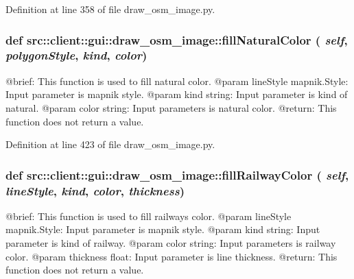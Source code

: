 Definition at line 358 of file draw\_\-osm\_\-image.py.

\hypertarget{namespacesrc_1_1client_1_1gui_1_1draw__osm__image_a273324065e46f166a37514bee78784cf}{
\subsubsection[{fillNaturalColor}]{\setlength{\rightskip}{0pt plus 5cm}def src::client::gui::draw\_\-osm\_\-image::fillNaturalColor ( {\em self}, \/   {\em polygonStyle}, \/   {\em kind}, \/   {\em color})}}
\label{namespacesrc_1_1client_1_1gui_1_1draw__osm__image_a273324065e46f166a37514bee78784cf}
\begin{DoxyVerb}
@brief: This function is used to fill natural color.
@param lineStyle mapnik.Style: Input parameter is mapnik style.
@param kind string: Input parameter is kind of natural.
@param color string: Input parameters is natural color. 
@return: This function does not return a value.
\end{DoxyVerb}
 

Definition at line 423 of file draw\_\-osm\_\-image.py.

\hypertarget{namespacesrc_1_1client_1_1gui_1_1draw__osm__image_a1e1d997267928524a9aaafed1e2a0c5d}{
\subsubsection[{fillRailwayColor}]{\setlength{\rightskip}{0pt plus 5cm}def src::client::gui::draw\_\-osm\_\-image::fillRailwayColor ( {\em self}, \/   {\em lineStyle}, \/   {\em kind}, \/   {\em color}, \/   {\em thickness})}}
\label{namespacesrc_1_1client_1_1gui_1_1draw__osm__image_a1e1d997267928524a9aaafed1e2a0c5d}
\begin{DoxyVerb}
@brief: This function is used to fill railways color.
@param lineStyle mapnik.Style: Input parameter is mapnik style.
@param kind string: Input parameter is kind of railway.
@param color string: Input parameters is railway color.
@param thickness float: Input parameter is line thickness.  
@return: This function does not return a value.
\end{DoxyVerb}
 


